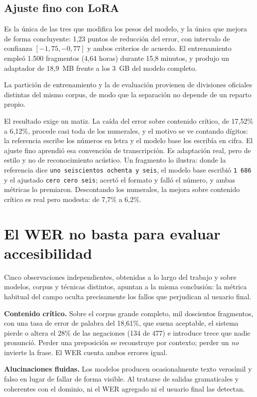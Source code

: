\subsection{Ajuste fino con LoRA}

Es la única de las tres que modifica los pesos del modelo, y la única que mejora de forma
concluyente: 1,23 puntos de reducción del error, con intervalo de confianza
$[-1{,}75, -0{,}77]$ y ambos criterios de acuerdo. El entrenamiento empleó 1.500 fragmentos
(4,64 horas) durante 15,8 minutos, y produjo un adaptador de 18,9~MB frente a los 3~GB del
modelo completo.

La partición de entrenamiento y la de evaluación provienen de divisiones oficiales
distintas del mismo corpus, de modo que la separación no depende de un reparto propio.

El resultado exige un matiz. La caída del error sobre contenido crítico, de 17,52\% a
6,12\%, procede casi toda de los numerales, y el motivo se ve contando dígitos: la
referencia escribe los números en letra y el modelo base los escribía en cifra. El ajuste
fino aprendió esa convención de transcripción. Es adaptación real, pero de estilo y no de
reconocimiento acústico. Un fragmento lo ilustra: donde la referencia dice
\texttt{uno seiscientos ochenta y seis}, el modelo base escribió \texttt{1 686} y el
ajustado \texttt{cero cero seis}; acertó el formato y falló el número, y ambas métricas lo
premiaron. Descontando los numerales, la mejora sobre contenido crítico es real pero
modesta: de 7,7\% a 6,2\%.

\section{El WER no basta para evaluar accesibilidad}

Cinco observaciones independientes, obtenidas a lo largo del trabajo y sobre modelos,
corpus y técnicas distintos, apuntan a la misma conclusión: la métrica habitual del campo
oculta precisamente los fallos que perjudican al usuario final.

\textbf{Contenido crítico.} Sobre el corpus grande completo, mil doscientos fragmentos, con
una tasa de error de palabra del 18,61\%, que suena aceptable, el sistema pierde o altera el
28\% de las negaciones (134 de 477) e introduce trece que nadie pronunció. Perder una
preposición se reconstruye por contexto; perder un \emph{no} invierte la frase. El WER
cuenta ambos errores igual.

\textbf{Alucinaciones fluidas.} Los modelos producen ocasionalmente texto verosímil y falso
en lugar de fallar de forma visible. Al tratarse de salidas gramaticales y coherentes con
el dominio, ni el WER agregado ni el usuario final las detectan.

